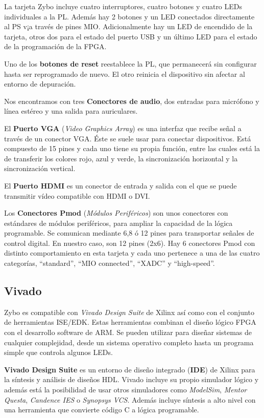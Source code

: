 La tarjeta Zybo incluye cuatro interruptores, cuatro botones y cuatro LEDs individuales a la PL. Además hay 2 botones y un LED conectados 
directamente al PS v¡a través de pines MIO. Adicionalmente hay un LED de encendido de la tarjeta, otros dos para el estado del puerto USB 
y un último LED para el estado de la programación de la FPGA.

Uno de los \textbf{botones de reset} reestablece la PL, que permanecerá sin configurar hasta ser reprogramado de nuevo. El otro reinicia 
el dispositivo sin afectar al entorno de depuración. 

Nos encontramos con tres \textbf{Conectores de audio}, dos entradas para micrófono y línea estéreo y una salida para auriculares.

El \textbf{Puerto VGA} (\textit{Video Graphics Array}) es una interfaz que recibe señal a través de un conector VGA. Éste se suele usar 
para conectar dispositivos. Está compuesto de 15 pines y cada uno tiene su propia función, entre las cuales está la de transferir los 
colores rojo, azul y verde, la sincronización horizontal y la sincronización vertical. 

El \textbf{Puerto HDMI} es un conector de entrada y salida con el que se puede transmitir vídeo compatible con HDMI o DVI. 

Los \textbf{Conectores Pmod} (\textit{Módulos Periféricos}) son unos conectores con estándares de módulos periféricos, para ampliar la capacidad de la 
lógica programable. Se comunican mediante 6,8 ó 12 pines para transportar señales de control digital. En nuestro caso, son 12 pines (2x6). 
Hay 6 conectores Pmod con distinto comportamiento en esta tarjeta y cada uno pertenece a una de las cuatro categorías, ``standard'', ``MIO connected'', 
``XADC'' y ``high-speed''.


\subsection{Vivado}

Zybo es compatible con \textit{Vivado Design Suite} de Xilinx así como con el conjunto de herramientas ISE/EDK.
Estas herramientas combinan el diseño lógico FPGA con el desarrollo software de ARM. Se pueden utilizar para diseñar sistemas 
de cualquier complejidad, desde un sistema operativo completo hasta un programa simple que controla algunos LEDs.

\textbf{Vivado Design Suite} es un entorno de diseño integrado (\textbf{IDE}) de Xilinx para la síntesis y análisis de diseños HDL. Vivado incluye 
su propio simulador lógico y además está la posibilidad de usar otros simuladores como \textit{ModelSim}, \textit{Mentor Questa}, 
\textit{Candence IES} o \textit{Synopsys VCS}. Además incluye síntesis a alto nivel con una herramienta que convierte código C a lógica
 programable.

